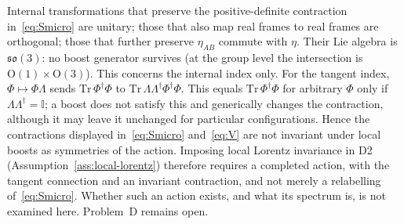 Internal transformations that preserve the positive-definite contraction
in~\eqref{eq:Smicro} are unitary; those that also map real frames to real
frames are orthogonal; those that further preserve \(\eta_{AB}\) commute with
\(\eta\). Their Lie algebra is \(\mathfrak{so}(3)\): no boost generator
survives (at the group level the intersection is
\(\mathrm{O}(1)\times\mathrm{O}(3)\)). This concerns the internal index only.
For the tangent index, \(\Phi\mapsto\Phi\Lambda\) sends
\(\mathrm{Tr}\,\Phi^\dagger\Phi\) to
\(\mathrm{Tr}\,\Lambda\Lambda^\dagger\Phi^\dagger\Phi\). This equals
\(\mathrm{Tr}\,\Phi^\dagger\Phi\) for arbitrary \(\Phi\) only if
\(\Lambda\Lambda^\dagger=\mathbb{I}\); a boost does not satisfy this and
generically changes the contraction, although it may leave it unchanged for
particular configurations. Hence the contractions displayed
in~\eqref{eq:Smicro} and~\eqref{eq:V} are not invariant under local boosts
as symmetries of the action. Imposing local Lorentz invariance in D2
(Assumption~\ref{ass:local-lorentz}) therefore requires a completed action,
with the tangent connection and an invariant contraction, and not merely a
relabelling of~\eqref{eq:Smicro}. Whether such an action exists, and what its
spectrum is, is not examined here. Problem~D remains open.

